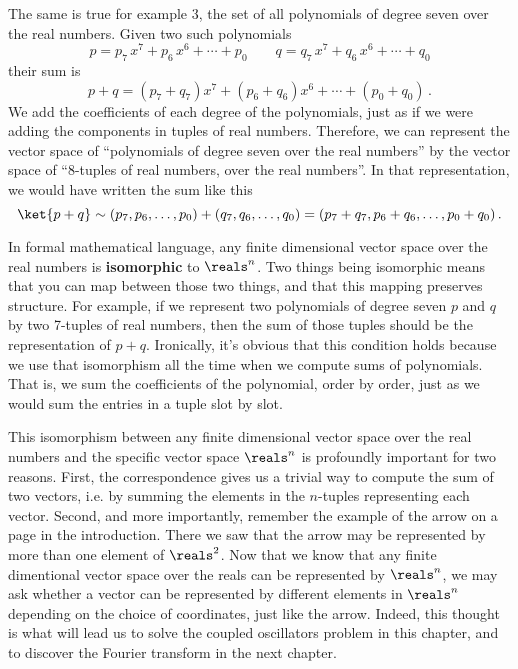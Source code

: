 The same is true for example 3, the set of all polynomials of degree seven over the real numbers.
Given two such polynomials
\begin{equation*}
  p = p_7 \, x^7 + p_6 \, x^6 + \cdots + p_0 \qquad
  q = q_7 \, x^7 + q_6 \, x^6 + \cdots + q_0
\end{equation*}
their sum is
\begin{equation*}
  p + q = (p_7 + q_7) x^7 + (p_6 + q_6)x^6 + \cdots + (p_0 + q_0)
  \, .
\end{equation*}
We add the coefficients of each degree of the polynomials, just as if we were adding the components in tuples of real numbers.
Therefore, we can represent the vector space of ``polynomials of degree seven over the real numbers'' by the vector space of ``8-tuples of real numbers, over the real numbers''.
In that representation, we would have written the sum like this
\begin{equation*}
  \ket{p + q}
  \sim (p_7, p_6, \ldots, p_0) + (q_7, q_6, \ldots, q_0) = (p_7 + q_7, p_6 + q_6, \ldots, p_0 + q_0)
  \, .
\end{equation*}

In formal mathematical language, any finite dimensional vector space over the real numbers is \textbf{isomorphic} to $\reals^n$.
Two things being isomorphic means that you can map between those two things, and that this mapping preserves structure.
For example, if we represent two polynomials of degree seven $p$ and $q$ by two 7-tuples of real numbers, then the sum of those tuples should be the representation of $p + q$.
Ironically, it's obvious that this condition holds because we use that isomorphism all the time when we compute sums of polynomials.
That is, we sum the coefficients of the polynomial, order by order, just as we would sum the entries in a tuple slot by slot.

This isomorphism between any finite dimensional vector space over the real numbers and the specific vector space $\reals^n$ is profoundly important for two reasons.
First, the correspondence gives us a trivial way to compute the sum of two vectors, i.e. by summing the elements in the $n$-tuples representing each vector.
Second, and more importantly, remember the example of the arrow on a page in the introduction.
There we saw that the arrow may be represented by more than one element of $\reals^2$.
Now that we know that any finite dimentional vector space over the reals can be represented by $\reals^n$, we may ask whether a vector can be represented by different elements in $\reals^n$ depending on the choice of coordinates, just like the arrow.
Indeed, this thought is what will lead us to solve the coupled oscillators problem in this chapter, and to discover the Fourier transform in the next chapter.

